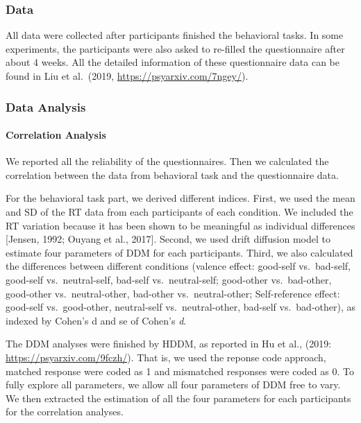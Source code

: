 \documentclass[man]{apa6}
\let\oldparagraph\paragraph
\renewcommand{\paragraph}[1]{\oldparagraph{#1}\mbox{}}
\begin{document}
\hypertarget{data}{%
\subsubsection{Data}\label{data}}

All data were collected after participants finished the behavioral tasks. In some experiments, the participants were also asked to re-filled the questionnaire after about 4 weeks. All the detailed information of these questionnaire data can be found in Liu et al.~(2019, \url{https://psyarxiv.com/7ngey/}).

\hypertarget{data-analysis-9}{%
\subsubsection{Data Analysis}\label{data-analysis-9}}

\hypertarget{correlation-analysis}{%
\paragraph{Correlation Analysis}\label{correlation-analysis}}

We reported all the reliability of the questionnaires. Then we calculated the correlation between the data from behavioral task and the questionnaire data.

For the behavioral task part, we derived different indices. First, we used the mean and SD of the RT data from each participants of each condition. We included the RT variation because it has been shown to be meaningful as individual differences {[}Jensen, 1992; Ouyang et al., 2017{]}. Second, we used drift diffusion model to estimate four parameters of DDM for each participants. Third, we also calculated the differences between different conditions (valence effect: good-self vs.~bad-self, good-self vs.~neutral-self, bad-self vs.~neutral-self; good-other vs.~bad-other, good-other vs.~neutral-other, bad-other vs.~neutral-other; Self-reference effect: good-self vs.~good-other, neutral-self vs.~neutral-other, bad-self vs.~bad-other), as indexed by Cohen's d and se of Cohen's \emph{d}.

The DDM analyses were finished by HDDM, as reported in Hu et al., (2019: \url{https://psyarxiv.com/9fczh/}). That is, we used the reponse code approach, matched response were coded as 1 and mismatched responses were coded as 0. To fully explore all parameters, we allow all four parameters of DDM free to vary. We then extracted the estimation of all the four parameters for each participants for the correlation analyses.
\end{document}
